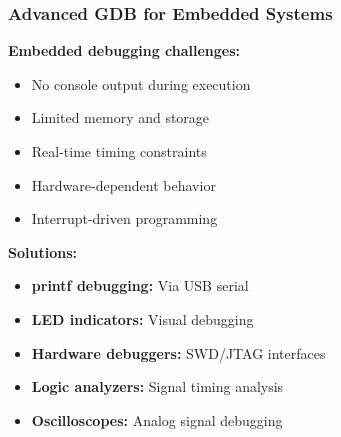 \documentclass{beamer}
\begin{document}
\begin{frame}
\frametitle{Advanced GDB for Embedded Systems}
\textbf{Embedded debugging challenges:}
\begin{itemize}
    \item No console output during execution
    \item Limited memory and storage
    \item Real-time timing constraints
    \item Hardware-dependent behavior
    \item Interrupt-driven programming
\end{itemize}

\vspace{0.5cm}
\textbf{Solutions:}
\begin{itemize}
    \item \textbf{printf debugging:} Via USB serial
    \item \textbf{LED indicators:} Visual debugging
    \item \textbf{Hardware debuggers:} SWD/JTAG interfaces
    \item \textbf{Logic analyzers:} Signal timing analysis
    \item \textbf{Oscilloscopes:} Analog signal debugging
\end{itemize}
\end{frame}
\end{document}

